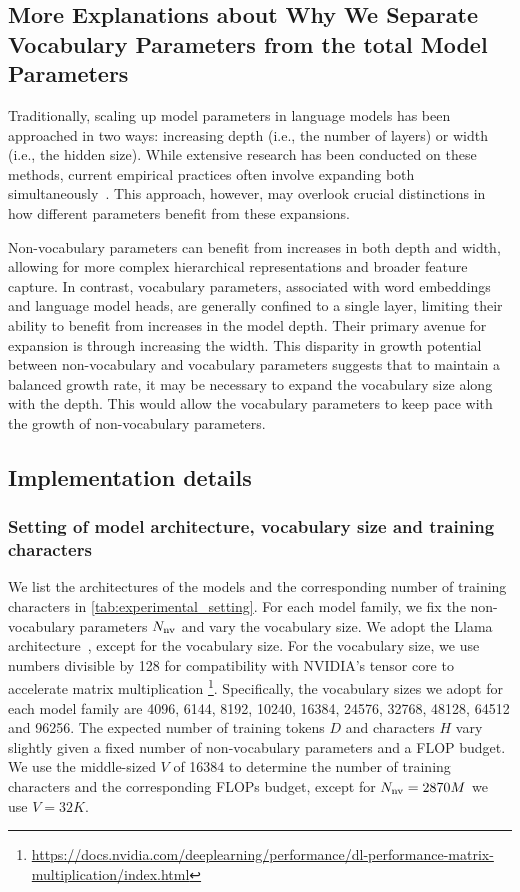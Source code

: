 \subsection{More Explanations about Why We Separate Vocabulary Parameters from the total Model Parameters}
\label{append:model_growing}
Traditionally, scaling up model parameters in language models has been approached in two ways: increasing depth (i.e., the number of layers) or width (i.e., the hidden size). While extensive research has been conducted on these methods, current empirical practices often involve expanding both simultaneously~\citep{tay-etal-2023-scaling}. This approach, however, may overlook crucial distinctions in how different parameters benefit from these expansions.

Non-vocabulary parameters can benefit from increases in both depth and width, allowing for more complex hierarchical representations and broader feature capture.
In contrast, vocabulary parameters, associated with word embeddings and language model heads, are generally confined to a single layer, limiting their ability to benefit from increases in the model depth. Their primary avenue for expansion is through increasing the width. This disparity in growth potential between non-vocabulary and vocabulary parameters suggests that to maintain a balanced growth rate, it may be necessary to expand the vocabulary size along with the depth. This would allow the vocabulary parameters to keep pace with the growth of non-vocabulary parameters.

\subsection{Implementation details}
\label{append:imple_details}
\subsubsection{Setting of model architecture, vocabulary size and training characters}
We list the architectures of the models and the corresponding number of training characters in \autoref{tab:experimental_setting}. For each model family, we fix the non-vocabulary parameters $N_{\rm nv}$ and vary the vocabulary size. We adopt the Llama architecture~\citep{touvron2023llama1}, except for the vocabulary size. For the vocabulary size, we use numbers divisible by 128 for compatibility with NVIDIA's tensor core to accelerate matrix multiplication \footnote{\url{https://docs.nvidia.com/deeplearning/performance/dl-performance-matrix-multiplication/index.html}}. Specifically, the vocabulary sizes we adopt for each model family are 4096, 6144, 8192, 10240, 16384, 24576, 32768, 48128, 64512 and 96256. The expected number of training tokens $D$ and characters $H$ vary slightly given a fixed number of non-vocabulary parameters and a FLOP budget. We use the middle-sized $V$ of 16384 to determine the number of training characters and the corresponding FLOPs budget, except for $N_{\rm nv}=2870M$ we use $V=32K$.

